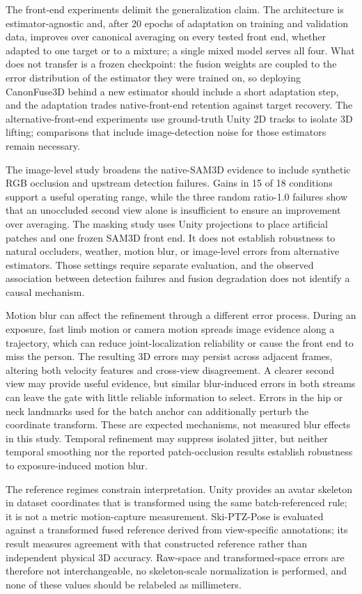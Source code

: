 \documentclass[preprint,12pt]{elsarticle}
\begin{document}
The front-end experiments delimit the generalization claim. The architecture is estimator-agnostic and, after 20 epochs of adaptation on training and validation data, improves over canonical averaging on every tested front end, whether adapted to one target or to a mixture; a single mixed model serves all four. What does not transfer is a frozen checkpoint: the fusion weights are coupled to the error distribution of the estimator they were trained on, so deploying CanonFuse3D behind a new estimator should include a short adaptation step, and the adaptation trades native-front-end retention against target recovery. The alternative-front-end experiments use ground-truth Unity 2D tracks to isolate 3D lifting; comparisons that include image-detection noise for those estimators remain necessary.

The image-level study broadens the native-SAM3D evidence to include synthetic RGB occlusion and upstream detection failures. Gains in 15 of 18 conditions support a useful operating range, while the three random ratio-1.0 failures show that an unoccluded second view alone is insufficient to ensure an improvement over averaging. The masking study uses Unity projections to place artificial patches and one frozen SAM3D front end. It does not establish robustness to natural occluders, weather, motion blur, or image-level errors from alternative estimators. Those settings require separate evaluation, and the observed association between detection failures and fusion degradation does not identify a causal mechanism.

Motion blur can affect the refinement through a different error process. During an exposure, fast limb motion or camera motion spreads image evidence along a trajectory, which can reduce joint-localization reliability or cause the front end to miss the person. The resulting 3D errors may persist across adjacent frames, altering both velocity features and cross-view disagreement. A clearer second view may provide useful evidence, but similar blur-induced errors in both streams can leave the gate with little reliable information to select. Errors in the hip or neck landmarks used for the batch anchor can additionally perturb the coordinate transform. These are expected mechanisms, not measured blur effects in this study. Temporal refinement may suppress isolated jitter, but neither temporal smoothing nor the reported patch-occlusion results establish robustness to exposure-induced motion blur.

The reference regimes constrain interpretation. Unity provides an avatar skeleton in dataset coordinates that is transformed using the same batch-referenced rule; it is not a metric motion-capture measurement. Ski-PTZ-Pose is evaluated against a transformed fused reference derived from view-specific annotations; its result measures agreement with that constructed reference rather than independent physical 3D accuracy. Raw-space and transformed-space errors are therefore not interchangeable, no skeleton-scale normalization is performed, and none of these values should be relabeled as millimeters.
\end{document}
